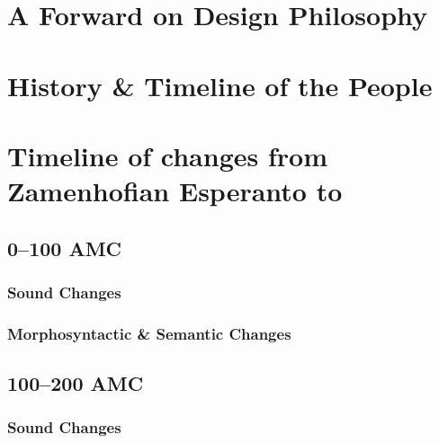 






\begin{titlingpage}
\titleAM
\clearpage
\end{titlingpage}

\frontmatter

\tableofcontents

\chapter{A Forward on Design Philosophy}

\chapter{History \& Timeline of the \peoplegroup{} People}

\mainmatter
{}

\chapter{Timeline of changes from Zamenhofian Esperanto to \langname{}}

\section{0--100 AMC}

\subsection{Sound Changes}


\subsection{Morphosyntactic \& Semantic Changes}


\section{100--200 AMC}

\subsection{Sound Changes}


